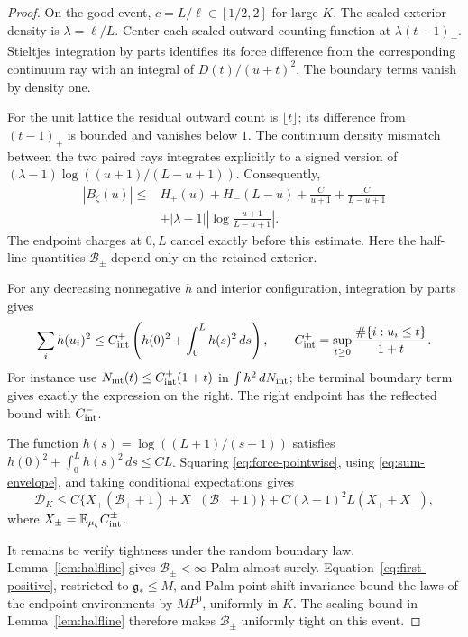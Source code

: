 \documentclass[11pt,reqno]{amsart}
\numberwithin{equation}{section}
\theoremstyle{definition}
\theoremstyle{remark}
\newcommand{\E}{\mathbb E}
\newcommand{\1}{\mathbf 1}
\newcommand{\dd}{\,d}
\newcommand{\gap}{\mathfrak g}
\newcommand{\calB}{\mathcal B}
\newcommand{\abs}[1]{\left\lvert #1\right\rvert}
\begin{document}
\begin{proof}
On the good event, $c=L/\ell\in[1/2,2]$ for large $K$. The scaled
exterior density is $\lambda=\ell/L$. Center each scaled outward
counting function at $\lambda(t-1)_+$.
Stieltjes integration by parts identifies its force difference from
the corresponding continuum ray with an integral of $D(t)/(u+t)^2$.
The boundary terms vanish by density one.

For the unit lattice the residual outward count is $\lfloor t\rfloor$;
its difference from $(t-1)_+$ is bounded and vanishes below $1$.
The continuum density mismatch between the two paired rays integrates
explicitly to a signed version of
$(\lambda-1)\log((u+1)/(L-u+1))$. Consequently,
\begin{equation}\label{eq:force-pointwise}
\begin{split}
|B_\zeta(u)|\le{}&
H_+(u)+H_-(L-u)+\frac C{u+1}+\frac C{L-u+1}\\
&+|\lambda-1|\abs{\log\frac{u+1}{L-u+1}}.
\end{split}
\end{equation}
The endpoint charges at $0,L$ cancel exactly before this estimate.
Here the half-line quantities $\calB_\pm$ depend only on the retained
exterior.

For any decreasing nonnegative $h$ and interior configuration,
integration by parts gives
\begin{equation}\label{eq:sum-envelope}
\sum_i h(u_i)^2
\le C_{\rm int}^+
\left(h(0)^2+\int_0^L h(s)^2\dd s\right),\qquad
C_{\rm int}^+=\sup_{t\ge0}\frac{\#\{i:u_i\le t\}}{1+t}.
\end{equation}
For instance use $N_{\rm int}(t)\le C_{\rm int}^+(1+t)$ in
$\int h^2\dd N_{\rm int}$; the terminal boundary term gives exactly
the expression on the right. The right endpoint has the reflected
bound with $C_{\rm int}^-$.

The function $h(s)=\log((L+1)/(s+1))$ satisfies
$h(0)^2+\int_0^Lh(s)^2\dd s\le CL$.
Squaring \eqref{eq:force-pointwise}, using
\eqref{eq:sum-envelope}, and taking conditional expectations gives
\begin{equation}\label{eq:force-total}
\mathcal D_K\le
C\{X_+(\calB_++1)+X_-(\calB_-+1)\}
+C(\lambda-1)^2L(X_++X_-),
\end{equation}
where $X_\pm=\E_{\mu_\zeta}C_{\rm int}^\pm$.

It remains to verify tightness under the random boundary law.
Lemma~\ref{lem:halfline} gives $\calB_\pm<\infty$ Palm-almost surely.
Equation~\eqref{eq:first-positive}, restricted to $\gap_*\le M$, and
Palm point-shift invariance bound the laws of the endpoint environments
by $M P^0$, uniformly in $K$. The scaling bound in
Lemma~\ref{lem:halfline} therefore makes $\calB_\pm$ uniformly tight on
this event.


\end{proof}
\end{document}
